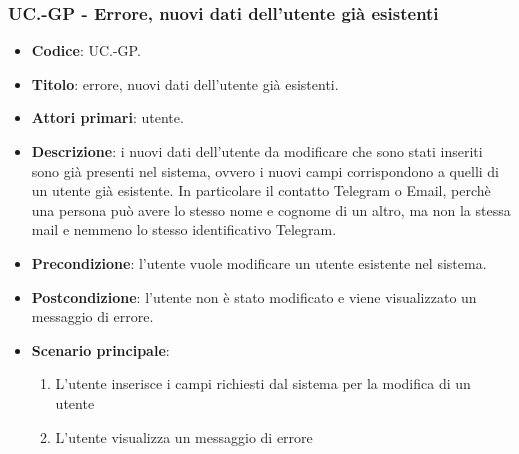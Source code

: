 		\subsubsection{UC\theuccount.\thesubuccount-GP - Errore, nuovi dati dell'utente già esistenti}
		
		\begin{itemize}
			\item \textbf{Codice}: UC\theuccount.\thesubuccount-GP.
			\item \textbf{Titolo}: errore, nuovi dati dell'utente già esistenti.
			\item \textbf{Attori primari}: utente.
			\item \textbf{Descrizione}: i nuovi dati dell'utente da modificare che sono stati inseriti sono già presenti nel sistema, ovvero i nuovi campi corrispondono a quelli di un utente già esistente. In particolare il contatto Telegram o Email, perchè una persona può avere lo stesso nome e cognome di un altro, ma non la stessa mail e nemmeno lo stesso identificativo Telegram.
			\item \textbf{Precondizione}: l'utente vuole modificare un utente esistente nel sistema.
			\item \textbf{Postcondizione}: l'utente non è stato modificato e viene visualizzato un messaggio di errore.
			\item \textbf{Scenario principale}:
			\begin{enumerate}
				\item L'utente inserisce i campi richiesti dal sistema per la modifica di un utente
				\item L'utente visualizza un messaggio di errore
			\end{enumerate}
		\end{itemize}
    
